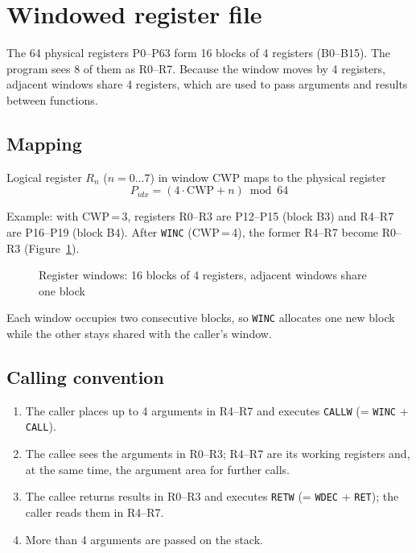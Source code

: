 \section{Windowed register file}
\label{sec:regfile}

The 64 physical registers P0--P63 form 16 blocks of 4 registers (B0--B15).
The program sees 8 of them as R0--R7. Because the window moves by 4
registers, adjacent windows share 4 registers, which are used to pass
arguments and results between functions.

\subsection{Mapping}

Logical register $R_n$ ($n = 0 \ldots 7$) in window CWP maps to the physical
register
\begin{equation}
  P_{\mathit{idx}} = (4 \cdot \mathrm{CWP} + n) \bmod 64
  \label{eq:window}
\end{equation}

Example: with CWP\,=\,3, registers R0--R3 are P12--P15 (block B3) and R4--R7
are P16--P19 (block B4). After \texttt{WINC} (CWP\,=\,4), the former R4--R7
become R0--R3 (Figure~\ref{fig:windows}).

\begin{figure}[htbp]
  \centering
  
  \caption{Register windows: 16 blocks of 4 registers, adjacent windows share one block}
  \label{fig:windows}
\end{figure}

Each window occupies two consecutive blocks, so \texttt{WINC} allocates one new
block while the other stays shared with the caller's window.

\subsection{Calling convention}

\begin{enumerate}
  \item The caller places up to 4 arguments in R4--R7 and executes
        \texttt{CALLW} (= \texttt{WINC} + \texttt{CALL}).
  \item The callee sees the arguments in R0--R3; R4--R7 are its working
        registers and, at the same time, the argument area for further calls.
  \item The callee returns results in R0--R3 and executes \texttt{RETW}
        (= \texttt{WDEC} + \texttt{RET}); the caller reads them in R4--R7.
  \item More than 4 arguments are passed on the stack.
\end{enumerate}

